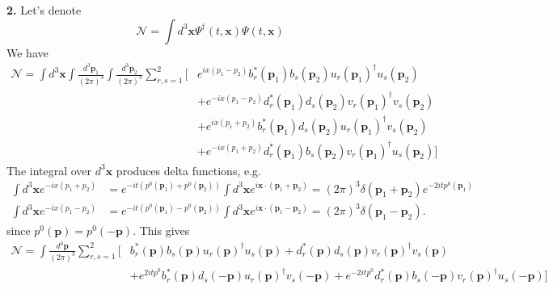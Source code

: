 \textbf{2.} Let's denote
\begin{equation}
    \mathcal{N} = \int d^3\mathbf{x} \Psi^\dagger(t, \mathbf{x})\Psi(t, \mathbf{x})
\end{equation}
We have
\begin{equation}
\begin{aligned}
    \mathcal{N} = \int d^3\mathbf{x} \int \frac{d^3\mathbf{p}_1}{(2\pi)^3} \int \frac{d^3\mathbf{p}_2}{(2\pi)^3} \sum_{r,s=1}^2 \bigg[ & e^{ix(p_1-p_2)} b_r^*(\mathbf{p}_1)b_s(\mathbf{p}_2)u_r(\mathbf{p}_1)^\dagger u_s(\mathbf{p}_2) \\
    &+ e^{-ix(p_1-p_2)} d_r^*(\mathbf{p}_1)d_s(\mathbf{p}_2)v_r(\mathbf{p}_1)^\dagger v_s(\mathbf{p}_2) \\
    &+ e^{ix(p_1+p_2)} b_r^*(\mathbf{p}_1)d_s(\mathbf{p}_2)u_r(\mathbf{p}_1)^\dagger v_s(\mathbf{p}_2) \\
    &+ e^{-ix(p_1+p_2)} d_r^*(\mathbf{p}_1)b_s(\mathbf{p}_2)v_r(\mathbf{p}_1)^\dagger u_s(\mathbf{p}_2) \bigg]
\end{aligned}
\end{equation}
The integral over $d^3\mathbf{x}$ produces delta functions, e.g.
\begin{equation}
\begin{aligned}
    \int d^3\mathbf{x} e^{-ix(p_1+p_2)} &= e^{-it(p^0(\mathbf{p}_1)+p^0(\mathbf{p}_2))} \int d^3\mathbf{x} e^{i\mathbf{x}\cdot(\mathbf{p}_1+\mathbf{p}_2)} = (2\pi)^3 \delta(\mathbf{p}_1+\mathbf{p}_2) e^{-2itp^0(\mathbf{p}_1)} \\
    \int d^3\mathbf{x} e^{-ix(p_1-p_2)} &= e^{-it(p^0(\mathbf{p}_1)-p^0(\mathbf{p}_2))} \int d^3\mathbf{x} e^{i\mathbf{x}\cdot(\mathbf{p}_1-\mathbf{p}_2)} = (2\pi)^3 \delta(\mathbf{p}_1-\mathbf{p}_2).
\end{aligned}
\end{equation}
since $p^0(\mathbf{p}) = p^0(-\mathbf{p})$. This gives
\begin{equation}
\begin{aligned}
    \mathcal{N} = \int \frac{d^3\mathbf{p}}{(2\pi)^3} \sum_{r,s=1}^2 \bigg[ & b_r^*(\mathbf{p})b_s(\mathbf{p})u_r(\mathbf{p})^\dagger u_s(\mathbf{p}) + d_r^*(\mathbf{p})d_s(\mathbf{p})v_r(\mathbf{p})^\dagger v_s(\mathbf{p}) \\
    &+ e^{2itp^0} b_r^*(\mathbf{p})d_s(-\mathbf{p})u_r(\mathbf{p})^\dagger v_s(-\mathbf{p}) + e^{-2itp^0} d_r^*(\mathbf{p})b_s(-\mathbf{p})v_r(\mathbf{p})^\dagger u_s(-\mathbf{p}) \bigg]
\end{aligned}
\end{equation}
